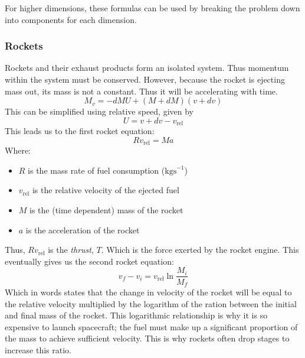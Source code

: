 \documentclass[12pt]{report}
\begin{document}
\bigskip
For higher dimensions, these formulas can be used by breaking the problem
down into components for each dimension.

\subsubsection*{Rockets}
Rockets and their exhaust products form an isolated system. Thus momentum
within the system must be conserved. However, because the rocket is ejecting
mass out, its mass is not a constant. Thus it will be accelerating with time.
\[M_v = -dMU + (M + dM)(v + dv)\]
This can be simplified using relative speed, given by
\[U = v + dv - v_\mathrm{rel}\]
This leads us to the first rocket equation:
\[Rv_\mathrm{rel} = Ma\]
Where:
\begin{itemize}
    \item \(R\) is the mass rate of fuel consumption (\(\mathrm{kgs}^{-1}\))
    \item \(v_\mathrm{rel}\) is the relative velocity of the ejected fuel
    \item \(M\) is the (time dependent) mass of the rocket
    \item \(a\) is the acceleration of the rocket
\end{itemize}
Thus, \(Rv_\mathrm{rel}\) is the \textit{thrust}, \(T\). Which is the force exerted
by the rocket engine. This eventually gives us the second rocket equation:
\[v_f - v_i = v_\mathrm{rel}\ln\frac{M_i}{M_f}\]
Which in words states that the change in velocity of the rocket will be equal
to the relative velocity multiplied by the logarithm of the ration between the
initial and final mass of the rocket. This logarithmic relationship is why
it is so expensive to launch spacecraft; the fuel must make up a significant
proportion of the mass to achieve sufficient velocity. This is why rockets
often drop stages to increase this ratio.
\end{document}
